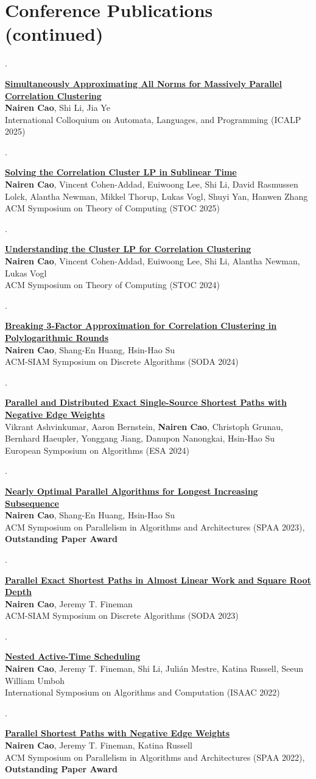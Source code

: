 \documentclass[10pt,a4paper]{article}
\newcounter{pub}
\newcommand{\publication}[3]{\stepcounter{pub}\begin{samepage}\noindent\begin{minipage}[t]{0.045\linewidth}\sffamily\small\color{muted}\thepub.\end{minipage}\begin{minipage}[t]{0.95\linewidth}\textbf{#1}\\#2\\{\small\sffamily\color{ink}#3}\end{minipage}\par\vspace{7pt}\end{samepage}}
\begin{document}
\section{Conference Publications (continued)}
\publication{\href{https://drops.dagstuhl.de/entities/document/10.4230/LIPIcs.ICALP.2025.40}{Simultaneously Approximating All Norms for Massively Parallel Correlation Clustering}}{\textbf{Nairen Cao}, Shi Li, Jia Ye}{International Colloquium on Automata, Languages, and Programming (ICALP 2025)}
\publication{\href{https://arxiv.org/abs/2503.20883}{Solving the Correlation Cluster LP in Sublinear Time}}{\textbf{Nairen Cao}, Vincent Cohen-Addad, Euiwoong Lee, Shi Li, David Rasmussen Lolck, Alantha Newman, Mikkel Thorup, Lukas Vogl, Shuyi Yan, Hanwen Zhang}{ACM Symposium on Theory of Computing (STOC 2025)}
\publication{\href{https://dl.acm.org/doi/abs/10.1145/3618260.3649749}{Understanding the Cluster LP for Correlation Clustering}}{\textbf{Nairen Cao}, Vincent Cohen-Addad, Euiwoong Lee, Shi Li, Alantha Newman, Lukas Vogl}{ACM Symposium on Theory of Computing (STOC 2024)}
\publication{\href{https://epubs.siam.org/doi/10.1137/1.9781611977912.143}{Breaking 3-Factor Approximation for Correlation Clustering in Polylogarithmic Rounds}}{\textbf{Nairen Cao}, Shang-En Huang, Hsin-Hao Su}{ACM-SIAM Symposium on Discrete Algorithms (SODA 2024)}
\publication{\href{https://nairenc.github.io/nairenc_files/parallel_negative_SSSP_almost_linear.pdf}{Parallel and Distributed Exact Single-Source Shortest Paths with Negative Edge Weights}}{Vikrant Ashvinkumar, Aaron Bernstein, \textbf{Nairen Cao}, Christoph Grunau, Bernhard Haeupler, Yonggang Jiang, Danupon Nanongkai, Hsin-Hao Su}{European Symposium on Algorithms (ESA 2024)}
\publication{\href{https://dl.acm.org/doi/10.1145/3558481.3591078}{Nearly Optimal Parallel Algorithms for Longest Increasing Subsequence}}{\textbf{Nairen Cao}, Shang-En Huang, Hsin-Hao Su}{ACM Symposium on Parallelism in Algorithms and Architectures (SPAA 2023), \textbf{Outstanding Paper Award}}
\publication{\href{https://epubs.siam.org/doi/10.1137/1.9781611977554.ch166}{Parallel Exact Shortest Paths in Almost Linear Work and Square Root Depth}}{\textbf{Nairen Cao}, Jeremy T. Fineman}{ACM-SIAM Symposium on Discrete Algorithms (SODA 2023)}
\publication{\href{https://drops.dagstuhl.de/opus/volltexte/2022/17321/}{Nested Active-Time Scheduling}}{\textbf{Nairen Cao}, Jeremy T. Fineman, Shi Li, Julián Mestre, Katina Russell, Seeun William Umboh}{International Symposium on Algorithms and Computation (ISAAC 2022)}
\publication{\href{https://dl.acm.org/doi/abs/10.1145/3490148.3538583}{Parallel Shortest Paths with Negative Edge Weights}}{\textbf{Nairen Cao}, Jeremy T. Fineman, Katina Russell}{ACM Symposium on Parallelism in Algorithms and Architectures (SPAA 2022), \textbf{Outstanding Paper Award}}
\end{document}
